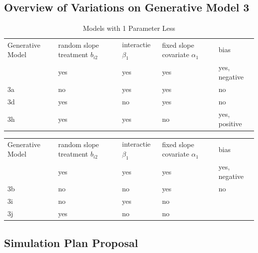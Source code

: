 \documentclass[
  12pt,
  a4paper,
]{article}
\begin{document}
\newpage

\subsection{Overview of Variations on Generative Model
3}\label{overview-of-variations-on-generative-model-3}

\begin{longtable}[]{@{}
  >{\raggedright\arraybackslash}p{}
  >{\raggedright\arraybackslash}p{}
  >{\raggedright\arraybackslash}p{}
  >{\raggedright\arraybackslash}p{}
  >{\raggedright\arraybackslash}p{}@{}}
\caption{Models with 1 Parameter Less}\tabularnewline
\toprule\noalign{}
\endfirsthead
\endhead
\bottomrule\noalign{}
\endlastfoot
Generative Model & random slope treatment \(b_{i2}\) & interactie
\(\beta_1\) & fixed slope covariate \(\alpha_1\) & bias \\
3 & yes & yes & yes & yes, negative \\
3a & no & yes & yes & no \\
3d & yes & no & yes & no \\
3h & yes & yes & no & yes, positive \\
\end{longtable}

\begin{longtable}[]{@{}
  >{\raggedright\arraybackslash}p{}
  >{\raggedright\arraybackslash}p{}
  >{\raggedright\arraybackslash}p{}
  >{\raggedright\arraybackslash}p{}
  >{\raggedright\arraybackslash}p{}@{}}
\toprule\noalign{}
\endhead
\bottomrule\noalign{}
\endlastfoot
Generative Model & random slope treatment \(b_{i2}\) & interactie
\(\beta_1\) & fixed slope covariate \(\alpha_1\) & bias \\
3 & yes & yes & yes & yes, negative \\
3b & no & no & yes & no \\
3i & no & yes & no & \\
3j & yes & no & no & \\
\end{longtable}

\subsection{Simulation Plan Proposal}\label{simulation-plan-proposal}
\end{document}
